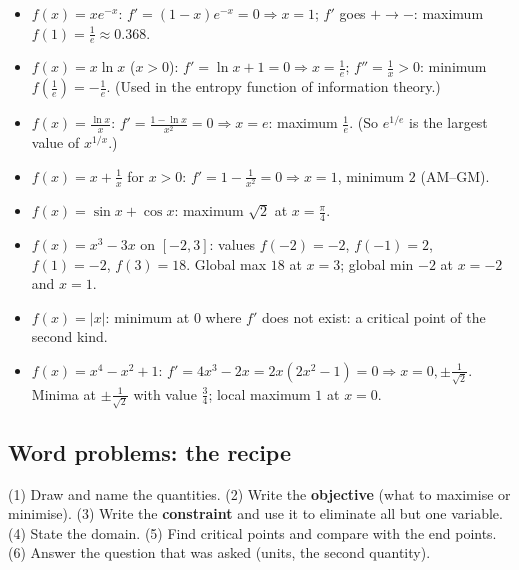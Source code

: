 \documentclass[11pt,a4paper]{article}
\begin{document}
\begin{center}
\end{center}

\begin{example}
\begin{itemize}[noitemsep]
\item $f(x)=x e^{-x}$: $f'=(1-x)e^{-x}=0\Rightarrow x=1$; $f'$ goes $+\to-$: maximum $f(1)=\frac1e\approx0.368$.
\item $f(x)=x\ln x$ ($x>0$): $f'=\ln x+1=0\Rightarrow x=\frac1e$; $f''=\frac1x>0$: minimum $f(\frac1e)=-\frac1e$. (Used in the entropy function of information theory.)
\item $f(x)=\frac{\ln x}{x}$: $f'=\frac{1-\ln x}{x^2}=0\Rightarrow x=e$: maximum $\frac1e$. (So $e^{1/e}$ is the largest value of $x^{1/x}$.)
\item $f(x)=x+\frac1x$ for $x>0$: $f'=1-\frac1{x^2}=0\Rightarrow x=1$, minimum $2$ (AM--GM).
\item $f(x)=\sin x+\cos x$: maximum $\sqrt2$ at $x=\frac\pi4$.
\item $f(x)=x^3-3x$ on $[-2,3]$: values $f(-2)=-2$, $f(-1)=2$, $f(1)=-2$, $f(3)=18$. Global max $18$ at $x=3$; global min $-2$ at $x=-2$ and $x=1$.
\item $f(x)=|x|$: minimum at $0$ where $f'$ does not exist: a critical point of the second kind.
\item $f(x)=x^4-x^2+1$: $f'=4x^3-2x=2x(2x^2-1)=0\Rightarrow x=0,\pm\frac1{\sqrt2}$. Minima at $\pm\frac{1}{\sqrt2}$ with value $\frac34$; local maximum $1$ at $x=0$.
\end{itemize}
\end{example}

\subsection{Word problems: the recipe}
\begin{intuition}
(1) Draw and name the quantities. (2) Write the \textbf{objective} (what to maximise or minimise). (3) Write the \textbf{constraint} and use it to eliminate all but one variable. (4) State the domain. (5) Find critical points and compare with the end points. (6) Answer the question that was asked (units, the second quantity).
\end{intuition}
\end{document}

